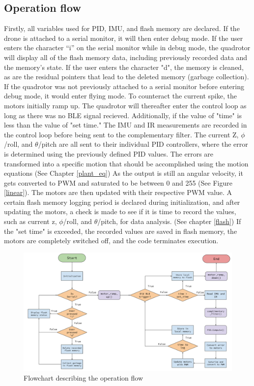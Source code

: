 \subsection{Operation flow}

Firstly, all variables used for PID, IMU, and flash memory are declared. If the drone is attached to a serial monitor, it will then enter debug mode. If the user enters the character “i” on the serial monitor while in debug mode, the quadrotor will display all of the flash memory data, including previously recorded data and the memory's state. 
If the user enters the character "d", the memory is cleaned, as are the residual pointers that lead to the deleted memory (garbage collection). If the quadrotor was not previously attached to a serial monitor before entering debug mode, it would enter flying mode. 
To counteract the current spike, the motors initially ramp up. The quadrotor will thereafter enter the control loop as long as there was no BLE signal recieved. Additionally, if the value of "time" is less than the value of "set time." The IMU and IR measurements are recorded in the control loop before being sent to the complementary filter. The current Z, $\phi$/roll, and $\theta$/pitch are all sent to their individual PID controllers, where the error is determined using the previously defined PID values. 
The errors are transformed into a specific motion that should be accomplished using the motion equations (See Chapter \ref{plant_eq}) 
As the output is still an angular velocity, it gets converted to PWM and saturated to be between 0 and 255 (See Figure \ref{linear}). 
The motors are then updated with their respective PWM value. 
A certain flash memory logging period is declared during initialization, and after updating the motors, a check is made to see if it is time to record the values, such as current z, $\phi$/roll, and $\theta$/pitch, for data analysis. (See chapter \ref{flash}) 
If the "set time" is exceeded, the recorded values are saved in flash memory, the motors are completely switched off, and the code terminates execution.

\begin{figure}[H]
    \begin{center}
    \includegraphics[scale=0.32]{pictures/flowchart}
    \end{center}
    \caption{Flowchart describing the operation flow}
    \label{fig:flowchart}
\end{figure}